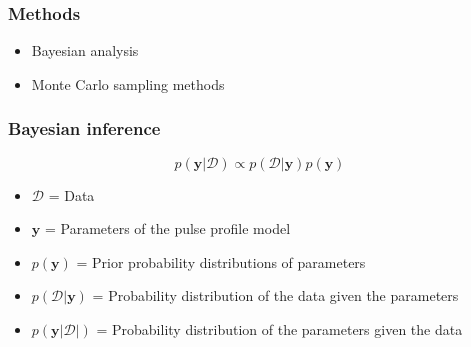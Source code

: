 \documentclass{beamer}
\def\be{\begin{equation}}
\def\ee{\end{equation}}
\begin{document}



\begin{frame}
\frametitle{Methods}
\begin{itemize}
\item Bayesian analysis
\item Monte Carlo sampling methods
\end{itemize}
\end{frame}


\begin{frame}
\frametitle{Bayesian inference}

\be \label{eq:bayes}
p(\textbf{y}|\mathcal{D}) \propto p(\mathcal{D}|\textbf{y})p(\textbf{y})
\ee
\begin{itemize}
\item $\mathcal{D}$ = Data
\item $\textbf{y}$ = Parameters of the pulse profile model
\item $p(\textbf{y})$ = Prior probability distributions of parameters
\item $p(\mathcal{D}|\textbf{y})$ = Probability distribution of the data given the parameters 
\item $p(\textbf{y}|\mathcal{D}|)$ = Probability distribution of the parameters given the data

\end{itemize}
\end{frame}




\end{document}
